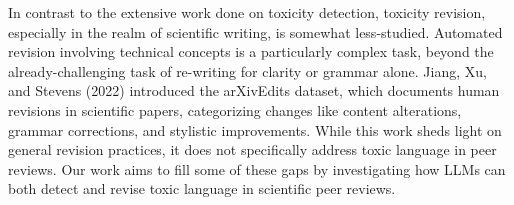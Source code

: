 
In contrast to the extensive work done on toxicity detection, toxicity revision, especially in the realm of scientific writing, is somewhat less-studied. Automated revision involving technical concepts is a particularly complex task, beyond the already-challenging task of re-writing for clarity or grammar alone. Jiang, Xu, and Stevens (2022) introduced the arXivEdits dataset, which documents human revisions in scientific papers, categorizing changes like content alterations, grammar corrections, and stylistic improvements. While this work sheds light on general revision practices, it does not specifically address toxic language in peer reviews. Our work aims to fill some of these gaps by investigating how LLMs can both detect and revise toxic language in scientific peer reviews.

